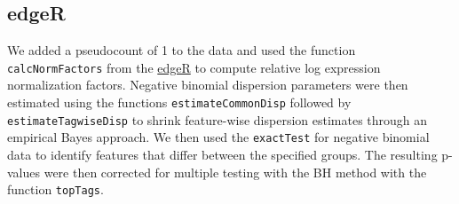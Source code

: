 \documentclass[
]{article}
\newenvironment{Shaded}{\begin{snugshade}}{\end{snugshade}}
\newcommand{\CommentTok}[1]{\textcolor[rgb]{0.56,0.35,0.01}{\textit{#1}}}
\newcommand{\DocumentationTok}[1]{\textcolor[rgb]{0.56,0.35,0.01}{\textbf{\textit{#1}}}}
\newcommand{\FloatTok}[1]{\textcolor[rgb]{0.00,0.00,0.81}{#1}}
\newcommand{\FunctionTok}[1]{\textcolor[rgb]{0.13,0.29,0.53}{\textbf{#1}}}
\newcommand{\NormalTok}[1]{#1}
\newcommand{\OtherTok}[1]{\textcolor[rgb]{0.56,0.35,0.01}{#1}}
\newcommand{\SpecialCharTok}[1]{\textcolor[rgb]{0.81,0.36,0.00}{\textbf{#1}}}
\begin{document}
\begin{Shaded}
\end{Shaded}

\hypertarget{edger}{%
\subsection{edgeR}\label{edger}}

We added a pseudocount of 1 to the data and used the function
\texttt{calcNormFactors} from the
\href{https://genomebiology.biomedcentral.com/articles/10.1186/gb-2010-11-3-r25}{edgeR}
to compute relative log expression normalization factors. Negative
binomial dispersion parameters were then estimated using the functions
\texttt{estimateCommonDisp} followed by \texttt{estimateTagwiseDisp} to
shrink feature-wise dispersion estimates through an empirical Bayes
approach. We then used the \texttt{exactTest} for negative binomial data
to identify features that differ between the specified groups. The
resulting p-values were then corrected for multiple testing with the BH
method with the function \texttt{topTags}.
\end{document}
